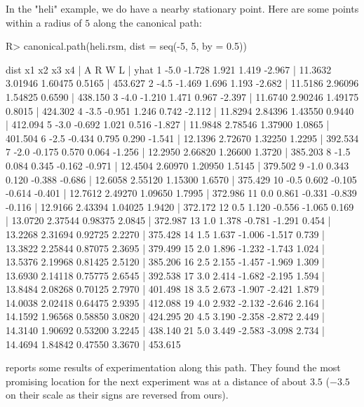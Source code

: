 \documentclass[article,nojss]{jss}
\begin{document}
In the "heli" example, we do have a nearby stationary point.  Here are some points within a radius of $5$ along the canonical path:
\begin{Schunk}
\begin{Sinput}
R> canonical.path(heli.rsm, dist = seq(-5, 5, by = 0.5))
\end{Sinput}
\begin{Soutput}
   dist     x1     x2     x3     x4 |       A       R       W      L |    yhat
1  -5.0 -1.728  1.921  1.419 -2.967 | 11.3632 3.01946 1.60475 0.5165 | 453.627
2  -4.5 -1.469  1.696  1.193 -2.682 | 11.5186 2.96096 1.54825 0.6590 | 438.150
3  -4.0 -1.210  1.471  0.967 -2.397 | 11.6740 2.90246 1.49175 0.8015 | 424.302
4  -3.5 -0.951  1.246  0.742 -2.112 | 11.8294 2.84396 1.43550 0.9440 | 412.094
5  -3.0 -0.692  1.021  0.516 -1.827 | 11.9848 2.78546 1.37900 1.0865 | 401.504
6  -2.5 -0.434  0.795  0.290 -1.541 | 12.1396 2.72670 1.32250 1.2295 | 392.534
7  -2.0 -0.175  0.570  0.064 -1.256 | 12.2950 2.66820 1.26600 1.3720 | 385.203
8  -1.5  0.084  0.345 -0.162 -0.971 | 12.4504 2.60970 1.20950 1.5145 | 379.502
9  -1.0  0.343  0.120 -0.388 -0.686 | 12.6058 2.55120 1.15300 1.6570 | 375.429
10 -0.5  0.602 -0.105 -0.614 -0.401 | 12.7612 2.49270 1.09650 1.7995 | 372.986
11  0.0  0.861 -0.331 -0.839 -0.116 | 12.9166 2.43394 1.04025 1.9420 | 372.172
12  0.5  1.120 -0.556 -1.065  0.169 | 13.0720 2.37544 0.98375 2.0845 | 372.987
13  1.0  1.378 -0.781 -1.291  0.454 | 13.2268 2.31694 0.92725 2.2270 | 375.428
14  1.5  1.637 -1.006 -1.517  0.739 | 13.3822 2.25844 0.87075 2.3695 | 379.499
15  2.0  1.896 -1.232 -1.743  1.024 | 13.5376 2.19968 0.81425 2.5120 | 385.206
16  2.5  2.155 -1.457 -1.969  1.309 | 13.6930 2.14118 0.75775 2.6545 | 392.538
17  3.0  2.414 -1.682 -2.195  1.594 | 13.8484 2.08268 0.70125 2.7970 | 401.498
18  3.5  2.673 -1.907 -2.421  1.879 | 14.0038 2.02418 0.64475 2.9395 | 412.088
19  4.0  2.932 -2.132 -2.646  2.164 | 14.1592 1.96568 0.58850 3.0820 | 424.295
20  4.5  3.190 -2.358 -2.872  2.449 | 14.3140 1.90692 0.53200 3.2245 | 438.140
21  5.0  3.449 -2.583 -3.098  2.734 | 14.4694 1.84842 0.47550 3.3670 | 453.615
\end{Soutput}
\end{Schunk}
\citet[Table~12.7 and~Figure~12.6]{Box05} reports some results of experimentation along this path.  They found the most promising location for the next experiment was at a distance of about $3.5$ ($-3.5$ on their scale as their signs are reversed from ours).
\end{document}
